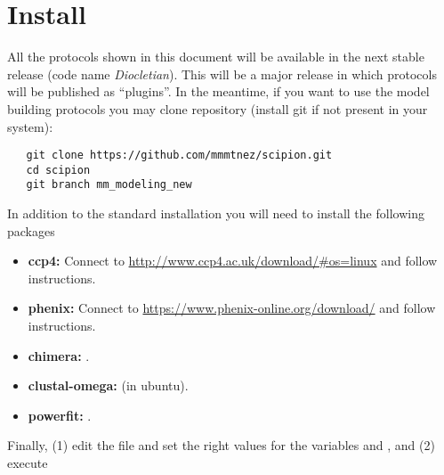 \section{Install}
  All the protocols shown in this document will be available in the next stable \scipion release (code name \textit{Diocletian}). This will be a major release in which protocols will be published as ``plugins''. In the meantime, if you want to use the model building protocols you may clone \scipion repository (install git if not present in your system):

  \begin{verbatim}
   git clone https://github.com/mmmtnez/scipion.git
   cd scipion
   git branch mm_modeling_new
  \end{verbatim}

  In addition to the standard \scipion installation you will need to install the following packages
  
  \begin{itemize}
   \item\textbf{ccp4:} Connect to \url{http://www.ccp4.ac.uk/download/#os=linux} and follow instructions.
   \item\textbf{phenix:} Connect to \url{https://www.phenix-online.org/download/} and follow instructions.
   \item\textbf{chimera:} .
   \item\textbf{clustal-omega:}  (in ubuntu).
   \item\textbf{powerfit:} .
  \end{itemize}

  
  Finally, (1) edit the file  and set the right values for the variables  and , and (2) execute 
